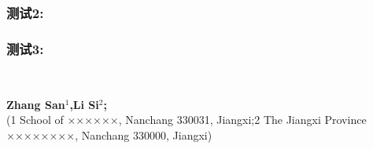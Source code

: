 \documentclass[a4paper,onecolumn,twosize]{article}
\begin{document}
\subsubsection{测试2:}
\subsubsection{测试3:}
  \renewcommand\refname{参考文献}
  
  \xiaowuhao{
  
   
  \setlength{\itemsep}{- 2mm}
}

\newpage

\begin{center}
  \parbox{\textwidth}{
    \vspace{25pt}
    \begin{center}
      {}\\
      \vspace{-0.0cm}
    \end{center}
    \begin{center}
      {\wuhao\textbf{Zhang San$^1$,Li Si$^2$;}}\\[2pt]
      {\liuhao(1 School of ××××××, Nanchang 330031, Jiangxi;2 The
      Jiangxi Province ××××××××, Nanchang 330000, Jiangxi)}\\[2pt]
    \end{center}
    {}
  }
\end{center}
\end{document}
